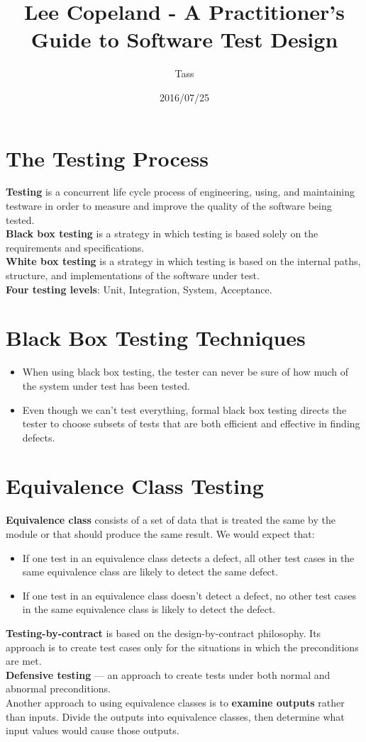 \documentclass{article}
\begin{document}
\title{Lee Copeland - A Practitioner's Guide to Software Test Design}
\author{Tass}
\date{2016/07/25}
\maketitle

\newpage
\section*{The Testing Process}
\textbf{Testing} is a concurrent life cycle process of engineering, using, and maintaining testware in order to measure and improve the quality of the software being tested.
\\
\textbf{Black box testing} is a strategy in which testing is based solely on the requirements and specifications.
\\
\textbf{White box testing} is a strategy in which testing is based on the internal paths, structure, and implementations of the software under test.
\\
\textbf{Four testing levels}: Unit, Integration, System, Acceptance.

\section*{Black Box Testing Techniques}
\begin{itemize}
\item When using black box testing, the tester can never be sure of how much of the system under test has been tested.
\item Even though we can't test everything, formal black box testing directs the tester to choose subsets of tests that are both efficient and effective in finding defects.
\end{itemize}

\section*{Equivalence Class Testing}
\textbf{Equivalence class} consists of a set of data that is treated the same by the module or that should produce the same result. We would expect that:
\begin{itemize}
\item If one test in an equivalence class detects a defect, all other test cases in the same equivalence class are likely to detect the same defect.
\item If one test in an equivalence class doesn't detect a defect, no other test cases in the same equivalence class is likely to detect the defect.
\end{itemize}
\textbf{Testing-by-contract} is based on the design-by-contract philosophy. Its approach is to create test cases only for the situations in which the preconditions are met.
\\
\textbf{Defensive testing} --- an approach to create tests under both normal and abnormal preconditions.
\\
Another approach to using equivalence classes is to \textbf{examine outputs} rather than inputs. Divide the outputs into equivalence classes, then determine what input values would cause those outputs.
\end{document}
